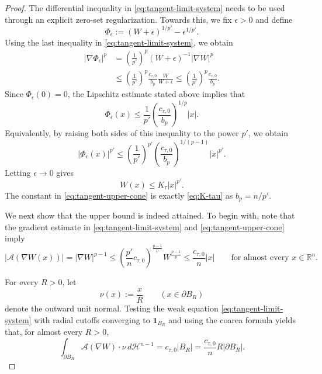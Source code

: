 \documentclass[reqno,12pt]{amsart}
\numberwithin{equation}{section}
\theoremstyle{remark}
\newcommand{\R}{\mathbb R}
\newcommand{\dd}{\,d}
\newcommand{\Acal}{\mathcal A}
\begin{document}
\begin{proof}
The differential inequality in \eqref{eq:tangent-limit-system} needs to be used through an explicit zero-set regularization.  Towards this, we fix $\epsilon>0$ and define
$$
\Phi_\epsilon := (W+\epsilon)^{1/p'} -\epsilon^{1/p'}.
$$
Using the last inequality in
\eqref{eq:tangent-limit-system}, we obtain
\begin{align*}
|\nabla\Phi_\epsilon|^p &=\left(\frac 1 {p'}\right)^p (W+\epsilon)^{-1}|\nabla W|^p\\
&\le\left(\frac 1 {p'} \right)^p \frac{c_{\tau,0}}{b_p} \frac{W}{W+\epsilon} \le \left(\frac1{p'}\right)^p \frac{c_{\tau,0}}{b_p}.
\end{align*}
Since $\Phi_\epsilon(0)=0$, the Lipschitz estimate stated above implies that
$$
\Phi_\epsilon(x) \le \frac{1}{p'}\left(\frac{c_{\tau,0}}{b_p}\right)^{1/p}\lvert x\rvert.
$$
Equivalently, by raising both sides of this inequality to the power $p'$, we obtain
$$
\lvert \Phi_\epsilon(x)\rvert^{p'} \le \left(\frac{1}{p'}\right)^{p'}\left(\frac{c_{\tau,0}}{b_p}\right)^{1/(p-1)}\lvert x\rvert^{p'}.
$$
Letting $\epsilon\to 0$ gives
\begin{equation}\label{eq:tangent-upper-cone}
W(x)\le K_\tau|x|^{p'}.
\end{equation}
The constant in \eqref{eq:tangent-upper-cone} is exactly
\eqref{eq:K-tau} as $b_p=n/p'$.

We next show that the upper bound is indeed attained. To begin with, note that the  gradient estimate in \eqref{eq:tangent-limit-system} and \eqref{eq:tangent-upper-cone} imply
\begin{equation}\label{eq:tangent-stress-bound}
|\Acal(\nabla W(x))|=|\nabla W|^{p-1}\le \left(\frac{p'}{n} c_{\tau,0}\right)^{\frac {p-1}{p}} W^{\frac {p-1}{p}} \le\frac{c_{\tau,0}}n|x| \qquad\text{for almost every } x\in \R^n.
\end{equation}

For every $R>0$, let
$$
\nu(x):=\frac{x}{R} \qquad (x\in\partial B_R)
$$
denote the outward unit normal.
Testing the weak equation \eqref{eq:tangent-limit-system} with radial cutoffs converging to $\mathbf1_{B_R}$ and using the coarea formula yields that, for almost every $R>0$,
\begin{equation}\label{eq:tangent-flux}
 \int_{\partial B_R}\Acal(\nabla W)\cdot\nu\dd \mathcal H^{n-1}
 =c_{\tau,0}|B_R|  =\frac{c_{\tau,0}}nR|\partial B_R|.
\end{equation}



\end{proof}
\end{document}
